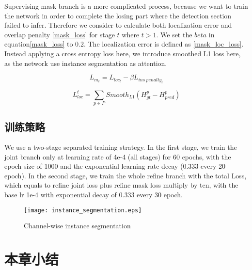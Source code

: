 Supervising mask branch is a more complicated process, because we want to train the network in order to complete the losing part where the detection section failed to infer. Therefore we consider to calculate both localization error and overlap penalty \eqref{mask_loss} for stage $t$ where $t>1$. We set the $beta$ in equation\eqref{mask_loss} to 0.2. The localization error is defined as \eqref{mask_loc_loss}. Instead applying a cross entropy loss here, we introduce smoothed L1 loss here, as the network use instance segmentation as attention.

\begin{equation}
\label{mask_loss}
L_{m_t}=L_{loc_t} - \beta L_{ins\ penalty_t}
\end{equation}

\begin{equation}
\label{mask_loc_loss}
L_{loc}^t =  \sum_{p \in P} Smooth_{L1}( H^{p}_{gt} - H^{p}_{pred} )
\end{equation}

\subsection{训练策略}
\label{subsec:trainingstrategy}
We use a two-stage separated training strategy. In the first stage, we train the joint branch only at learning rate of 4e-4 (all stages) for 60 epochs, with the epoch size of 1000 and the exponential learning rate decay (0.333 every 20 epoch). In the second stage, we train the whole refine branch with the total Loss, which equals to refine joint loss plus refine mask loss multiply by ten, with the base lr 1e-4 with exponential decay of 0.333 every 30 epoch.


\begin{figure}[htbp]
	\centering
	\texttt{[image: instance\_segmentation.eps]}
	\caption{Channel-wise instance segmentation}
	\label{fig:chInsSeg}
\end{figure}

\section{本章小结}
